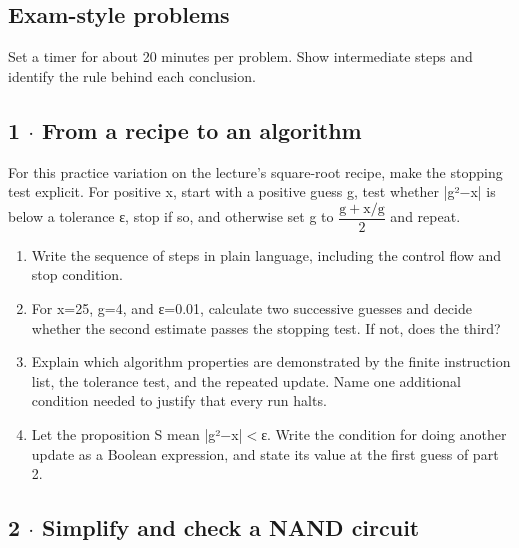 \documentclass[11pt]{article}
\begin{document}
\begin{keepsection}
\section{Exam-style problems}

Set a timer for about 20 minutes per problem. Show intermediate steps and identify the rule behind each conclusion.

\begin{keepsection}
\subsection{1 \ensuremath{\cdot} From a recipe to an algorithm}

For this practice variation on the lecture's square-root recipe, make the stopping test explicit. For positive x, start with a positive guess g, test whether |g²\ensuremath{-}x| is below a tolerance ε, stop if so, and otherwise set g to {\small\ensuremath{\dfrac{\mathrm{g}+\mathrm{x}/\mathrm{g}}{2}}} and repeat.

\begin{enumerate}
\item Write the sequence of steps in plain language, including the control flow and stop condition.
\item For x=25, g=4, and ε=0.01, calculate two successive guesses and decide whether the second estimate passes the stopping test. If not, does the third?
\item Explain which algorithm properties are demonstrated by the finite instruction list, the tolerance test, and the repeated update. Name one additional condition needed to justify that every run halts.
\item Let the proposition S mean |g²\ensuremath{-}x|\ensuremath{<}ε. Write the condition for doing another update as a Boolean expression, and state its value at the first guess of part 2.
\end{enumerate}

\end{keepsection}

\begin{keepsection}
\subsection{2 \ensuremath{\cdot} Simplify and check a NAND circuit}


\end{keepsection}
\end{keepsection}
\end{document}
